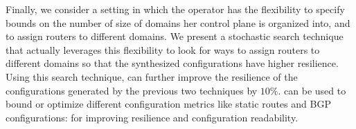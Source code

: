 Finally, we consider a setting in which the operator has the
flexibility to specify bounds on the number of size of domains her
control plane is organized into, and to assign routers to different
domains.  We present a stochastic search technique that actually
leverages this flexibility to look for ways to assign routers to
different domains so that the synthesized configurations have higher
resilience.  Using this search technique, \name can further improve
the resilience of the configurations generated by the previous two
techniques by $10\%$. \name can be used to bound or optimize different
configuration metrics like static routes and BGP configurations: for
improving resilience and configuration readability. 







